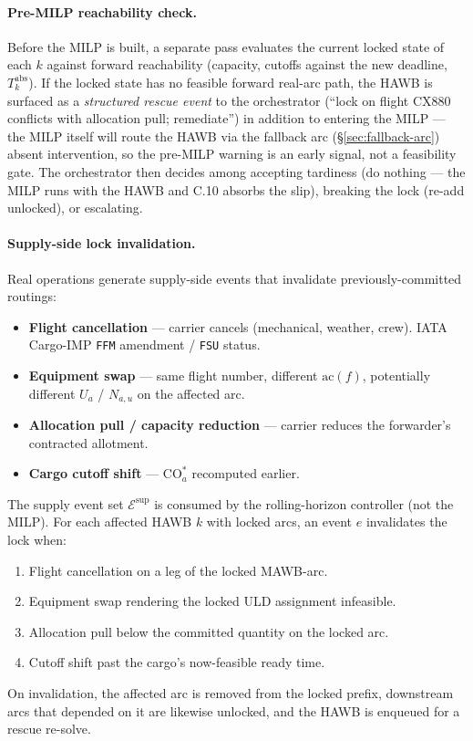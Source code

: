 \documentclass[11pt,a4paper]{article}
\theoremstyle{definition}
\begin{document}
\paragraph{Pre-MILP reachability check.}
Before the MILP is built, a separate pass evaluates the current locked state
of each $k$ against forward reachability (capacity, cutoffs against the new
deadline, $T_k^{\text{abs}}$). If the locked state has no feasible forward
real-arc path, the HAWB is surfaced as a \emph{structured rescue event} to
the orchestrator (``lock on flight CX880 conflicts with allocation pull;
remediate'') in addition to entering the MILP --- the MILP itself will route
the HAWB via the fallback arc (\S\ref{sec:fallback-arc}) absent intervention,
so the pre-MILP warning is an early signal, not a feasibility gate. The
orchestrator then decides among accepting tardiness (do nothing --- the MILP
runs with the HAWB and C.10 absorbs the slip), breaking the lock (re-add
unlocked), or escalating.

\paragraph{Supply-side lock invalidation.}
Real operations generate supply-side events that invalidate previously-committed
routings:
\begin{itemize}[noitemsep]
  \item \textbf{Flight cancellation} --- carrier cancels (mechanical, weather,
        crew). IATA Cargo-IMP \texttt{FFM} amendment / \texttt{FSU} status.
  \item \textbf{Equipment swap} --- same flight number, different
        $\text{ac}(f)$, potentially different $U_a$ / $N_{a,u}$ on the
        affected arc.
  \item \textbf{Allocation pull / capacity reduction} --- carrier reduces the
        forwarder's contracted allotment.
  \item \textbf{Cargo cutoff shift} --- $\text{CO}_a^*$ recomputed earlier.
\end{itemize}
The supply event set $\mathcal{E}^{\text{sup}}$ is consumed by the
rolling-horizon controller (not the MILP). For each affected HAWB $k$ with
locked arcs, an event $e$ invalidates the lock when:
\begin{enumerate}[noitemsep,label=(\alph*)]
  \item Flight cancellation on a leg of the locked MAWB-arc.
  \item Equipment swap rendering the locked ULD assignment infeasible.
  \item Allocation pull below the committed quantity on the locked arc.
  \item Cutoff shift past the cargo's now-feasible ready time.
\end{enumerate}
On invalidation, the affected arc is removed from the locked prefix,
downstream arcs that depended on it are likewise unlocked, and the HAWB is
enqueued for a rescue re-solve.
\end{document}
